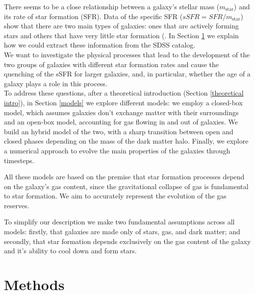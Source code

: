 \documentclass[fleqn,usenatbib]{mnras}
\begin{document}
There seems to be a close relationship between a galaxy's stellar mass ($m_\text{star}$) and its rate of star formation (SFR).
Data of the specific SFR ($sSFR  = SFR / m_\text{star}$) show that there are two main types of galaxies: ones that are actively forming stars and others that have very little star formation (\cite{kauffmann_dependence_2003}. In Section \ref{methods} we explain how we could extract these information from the SDSS catalog.\\
We want to investigate the physical processes that lead to the development of the two groups of galaxies with different star formation rates and cause the quenching of the sSFR for larger galaxies, and, in particular, whether the age of a galaxy plays a role in this process.\\

To address these questions, after a theoretical introduction (Section \ref{theoretical intro}), in Section \ref{models} we explore different models: we employ a closed-box model, which assumes galaxies don't exchange matter with their surroundings and an open-box model, accounting for gas flowing in and out of galaxies. We build an hybrid model of the two, with a sharp transition between open and closed phases depending on the mass of the dark matter halo. Finally, we explore a numerical approach to evolve the main properties of the galaxies through timesteps.

All these models are based on the premise that star formation processes depend on the galaxy's gas content, since the gravitational collapse of gas is fundamental to star formation.
We aim to accurately represent the evolution of the gas reserves.

To simplify our description we make two fundamental assumptions across all models: firstly, that galaxies are made only of stars, gas, and dark matter; and secondly, that star formation depends exclusively on the gas content of the galaxy and it's ability to cool down and form stars.

\section{Methods}
\label{methods}
\end{document}
